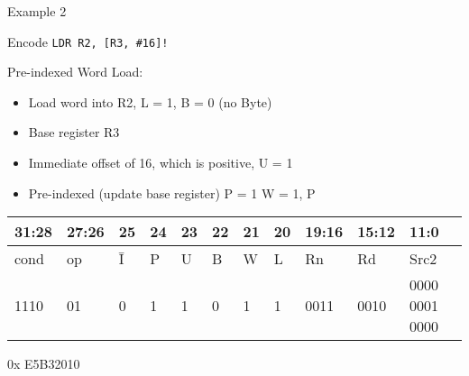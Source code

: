 \documentclass[aspectratio=169]{beamer}
\begin{document}
\begin{frame}{Example 2}
    \begin{tcolorbox}[
        enhanced,
        colback=androidBlueLight,
        colframe=androidBlue,
        arc=5pt,
        boxrule=1pt,
        title=\textbf{},
        fonttitle=\bfseries,
        coltitle=black,
        top=10pt,
        bottom=8pt,
        left=8pt,
        right=8pt,
        attach boxed title to top left={xshift=10pt, yshift=-\tcboxedtitleheight/2},
        boxed title style={
            colback=androidBlue,    
            colframe=androidBlue,
            arc=3pt,
            boxrule=0pt,
            left=6pt, right=6pt,
            top=3pt, bottom=3pt
        }
        ]
        Encode     \texttt{LDR R2, [R3, \#16]!}
    \end{tcolorbox}

    Pre-indexed Word Load:
    \begin{itemize}
        \item Load word into R2, L = 1, B = 0 (no Byte)
        \item Base register R3
        \item Immediate offset of 16, which is positive, U = 1
        \item Pre-indexed (update base register) P = 1 W = 1, P
    \end{itemize}

    \footnotesize 
    \begin{center}
        \renewcommand{\arraystretch}{1.2}
        \begin{tabular}{|p{3.0em}|p{3.0em}|p{1.5em}|p{1.5em}|p{1.5em}|p{1.5em}|p{1.5em}|p{1.5em}|p{3.0em}|p{3.0em}|p{7.0em}|}
        \hline
        31:28 & 27:26 & 25 & 24 & 23 & 22 & 21 & 20 & 19:16 & 15:12 & 11:0\\
        \hline
        cond & op & \=I & P & U & B & W & L & Rn & Rd & Src2\\
        \hline
        1110 & 01 & 0 & 1 & 1 & 0 & 1 & 1 & 0011 & 0010 & 0000 0001 0000\\
        \hline
        \end{tabular}

        \vspace{0.5em}

            0x E5B32010

    \end{center}
\end{frame}
\end{document}
